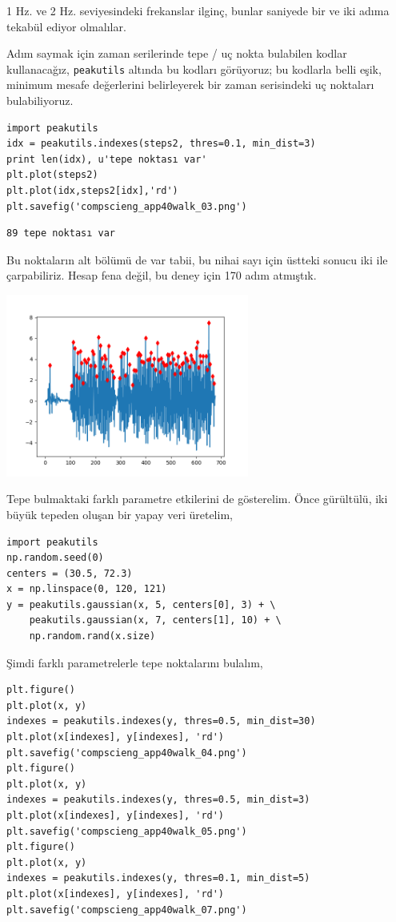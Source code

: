 \documentclass[12pt,fleqn]{article}\usepackage{../../common}
\begin{document}
1 Hz. ve 2 Hz. seviyesindeki frekanslar ilginç, bunlar saniyede bir ve iki
adıma tekabül ediyor olmalılar. 

Adım saymak için zaman serilerinde tepe / uç nokta bulabilen kodlar
kullanacağız, \verb!peakutils! altında bu kodları görüyoruz; bu kodlarla
belli eşik, minimum mesafe değerlerini belirleyerek bir zaman serisindeki
uç noktaları bulabiliyoruz.

\begin{verbatim}
import peakutils
idx = peakutils.indexes(steps2, thres=0.1, min_dist=3)
print len(idx), u'tepe noktası var'
plt.plot(steps2)
plt.plot(idx,steps2[idx],'rd')
plt.savefig('compscieng_app40walk_03.png')
\end{verbatim}

\begin{verbatim}
89 tepe noktası var
\end{verbatim}

Bu noktaların alt bölümü de var tabii, bu nihai sayı için üstteki sonucu
iki ile çarpabiliriz. Hesap fena değil, bu deney için 170 adım atmıştık.

\includegraphics[height=6cm]{compscieng_app40walk_03.png}

Tepe bulmaktaki farklı parametre etkilerini de gösterelim. Önce gürültülü,
iki büyük tepeden oluşan bir yapay veri üretelim,

\begin{verbatim}
import peakutils
np.random.seed(0)
centers = (30.5, 72.3)
x = np.linspace(0, 120, 121)
y = peakutils.gaussian(x, 5, centers[0], 3) + \
    peakutils.gaussian(x, 7, centers[1], 10) + \
    np.random.rand(x.size)
\end{verbatim}

Şimdi farklı parametrelerle tepe noktalarını bulalım,

\begin{verbatim}
plt.figure()
plt.plot(x, y)
indexes = peakutils.indexes(y, thres=0.5, min_dist=30)
plt.plot(x[indexes], y[indexes], 'rd')
plt.savefig('compscieng_app40walk_04.png')
plt.figure()
plt.plot(x, y)
indexes = peakutils.indexes(y, thres=0.5, min_dist=3)
plt.plot(x[indexes], y[indexes], 'rd')
plt.savefig('compscieng_app40walk_05.png')
plt.figure()
plt.plot(x, y)
indexes = peakutils.indexes(y, thres=0.1, min_dist=5)
plt.plot(x[indexes], y[indexes], 'rd')
plt.savefig('compscieng_app40walk_07.png')
\end{verbatim}
\end{document}
